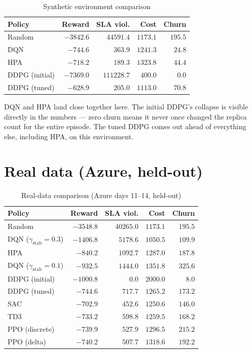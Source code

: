 \documentclass{rapportINPTCLOUD}
\begin{document}
\begin{table}[h]
\centering
\begin{tabular}{lrrrr}
\toprule
\textbf{Policy} & \textbf{Reward} & \textbf{SLA viol.} & \textbf{Cost} & \textbf{Churn} \\
\midrule
Random          & $-3842.6$ & $44591.4$  & $1173.1$ & $195.5$ \\
DQN             & $-744.6$  & $363.9$    & $1241.3$ & $24.8$ \\
HPA             & $-718.2$  & $189.3$    & $1323.8$ & $44.4$ \\
DDPG (initial)  & $-7369.0$ & $111228.7$ & $400.0$  & $0.0$ \\
DDPG (tuned)    & $-628.9$  & $205.0$    & $1113.0$ & $70.8$ \\
\bottomrule
\end{tabular}
\caption{Synthetic environment comparison}
\end{table}

DQN and HPA land close together here. The initial DDPG's collapse is visible directly in the numbers — zero churn means it never once changed the replica count for the entire episode. The tuned DDPG comes out ahead of everything else, including HPA, on this environment.

\section{Real data (Azure, held-out)}

\begin{table}[h]
\centering
\begin{tabular}{lrrrr}
\toprule
\textbf{Policy} & \textbf{Reward} & \textbf{SLA viol.} & \textbf{Cost} & \textbf{Churn} \\
\midrule
Random                        & $-3548.8$ & $40265.0$ & $1173.1$ & $195.5$ \\
DQN ($\gamma_{\text{stab}}{=}0.3$) & $-1406.8$ & $5178.6$  & $1050.5$ & $109.9$ \\
HPA                           & $-840.2$  & $1092.7$  & $1287.0$ & $187.8$ \\
DQN ($\gamma_{\text{stab}}{=}0.1$) & $-932.5$  & $1444.0$  & $1351.8$ & $325.6$ \\
DDPG (initial)                & $-1000.8$ & $0.0$     & $2000.0$ & $8.0$ \\
DDPG (tuned)                  & $-744.6$  & $717.7$   & $1265.2$ & $173.2$ \\
SAC                           & $-702.9$  & $452.6$   & $1250.6$ & $146.0$ \\
TD3                           & $-733.2$  & $598.8$   & $1259.5$ & $168.2$ \\
PPO (discrete)                & $-739.9$  & $527.9$   & $1296.5$ & $215.2$ \\
PPO (delta)                   & $-740.2$  & $507.7$   & $1318.6$ & $192.2$ \\
\bottomrule
\end{tabular}
\caption{Real-data comparison (Azure days 11--14, held-out)}
\end{table}
\end{document}
